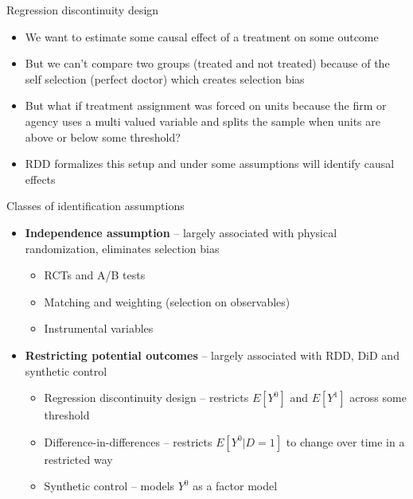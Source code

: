 \documentclass{beamer}
\begin{document}
	



\begin{frame}{Regression discontinuity design}

	\begin{itemize}	
	\item We want to estimate some causal effect of a treatment on some outcome
	\item But we can't compare two groups (treated and not treated) because of the self selection (perfect doctor) which creates selection bias
	\item But what if treatment assignment was forced on units because the firm or agency uses a multi valued variable and splits the sample when units are above or below some threshold?
	\item RDD formalizes this setup and under some assumptions will identify causal effects
	\end{itemize}
\end{frame}

\begin{frame}{Classes of identification assumptions}


\begin{itemize}
\item \textbf{Independence assumption} -- largely associated with physical randomization, eliminates selection bias
	\begin{itemize}
	\item RCTs and A/B tests
	\item Matching and weighting (selection on observables)
	\item Instrumental variables
	\end{itemize}
\item \textbf{Restricting potential outcomes} -- largely associated with RDD, DiD and synthetic control
	\begin{itemize}
	\item Regression discontinuity design -- restricts $E[Y^0]$ and $E[Y^1]$ across some threshold
	\item Difference-in-differences -- restricts $E[Y^0 | D=1]$ to change over time in a restricted way\
	\item Synthetic control -- models $Y^0$ as a factor model
	\end{itemize}
\end{itemize}
	
\end{frame}
\end{document}
